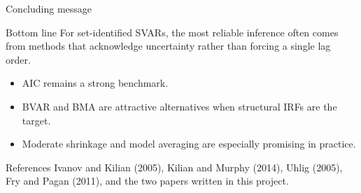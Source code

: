 \documentclass[aspectratio=169]{beamer}
\begin{document}
\begin{frame}{Concluding message}
  \begin{block}{Bottom line}
    For set-identified SVARs, the most reliable inference often comes from methods that acknowledge uncertainty rather than forcing a single lag order.
  \end{block}
  \vspace{0.3cm}
  \begin{itemize}
    \item AIC remains a strong benchmark.
    \item BVAR and BMA are attractive alternatives when structural IRFs are the target.
    \item Moderate shrinkage and model averaging are especially promising in practice.
  \end{itemize}
\end{frame}

\begin{frame}{References}
  \footnotesize
  Ivanov and Kilian (2005), Kilian and Murphy (2014), Uhlig (2005), Fry and Pagan (2011), and the two papers written in this project.
\end{frame}
\end{document}
